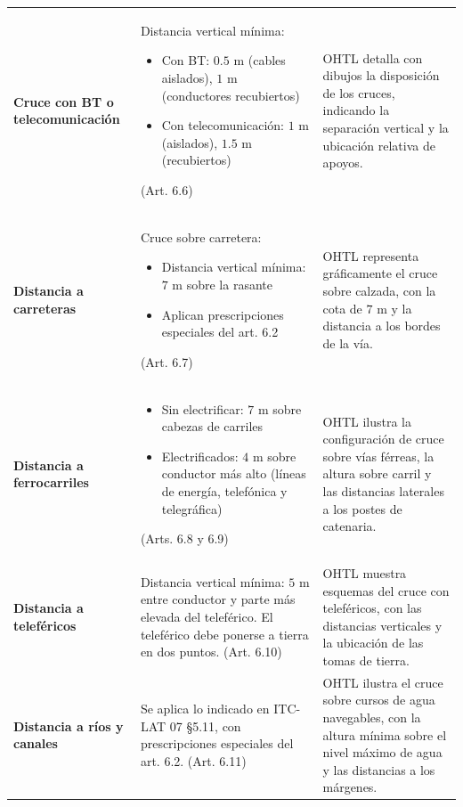 \documentclass[12pt,a4paper]{article}
\begin{document}
\begin{longtable}{p{3.5cm}p{5cm}p{5cm}}
\addlinespace

\textbf{Cruce con BT o}
\textbf{telecomunicación}
&
Distancia vertical mínima:
\begin{itemize}
    \item Con BT: $0.5$ m (cables aislados), $1$ m (conductores recubiertos)
    \item Con telecomunicación: $1$ m (aislados), $1.5$ m (recubiertos)
\end{itemize}
(Art. 6.6)
&
OHTL detalla con dibujos la disposición de los cruces,
indicando la separación vertical y la ubicación relativa
de apoyos.
\\

\addlinespace

\textbf{Distancia a carreteras}
&
Cruce sobre carretera:
\begin{itemize}
    \item Distancia vertical mínima: $7$ m sobre la rasante
    \item Aplican prescripciones especiales del art. 6.2
\end{itemize}
(Art. 6.7)
&
OHTL representa gráficamente el cruce sobre calzada,
con la cota de $7$ m y la distancia a los bordes de la vía.
\\

\addlinespace

\textbf{Distancia a ferrocarriles}
&
\begin{itemize}
    \item Sin electrificar: $7$ m sobre cabezas de carriles
    \item Electrificados: $4$ m sobre conductor más alto
          (líneas de energía, telefónica y telegráfica)
\end{itemize}
(Arts. 6.8 y 6.9)
&
OHTL ilustra la configuración de cruce sobre vías
férreas, la altura sobre carril y las distancias laterales
a los postes de catenaria.
\\

\addlinespace

\textbf{Distancia a teleféricos}
&
Distancia vertical mínima: $5$ m entre conductor y
parte más elevada del teleférico. El teleférico debe
ponerse a tierra en dos puntos.
(Art. 6.10)
&
OHTL muestra esquemas del cruce con teleféricos,
con las distancias verticales y la ubicación de las
tomas de tierra.
\\

\addlinespace

\textbf{Distancia a ríos y canales}
&
Se aplica lo indicado en ITC-LAT 07 \S 5.11,
con prescripciones especiales del art. 6.2.
(Art. 6.11)
&
OHTL ilustra el cruce sobre cursos de agua navegables,
con la altura mínima sobre el nivel máximo de agua
y las distancias a los márgenes.
\\


\end{longtable}
\end{document}
